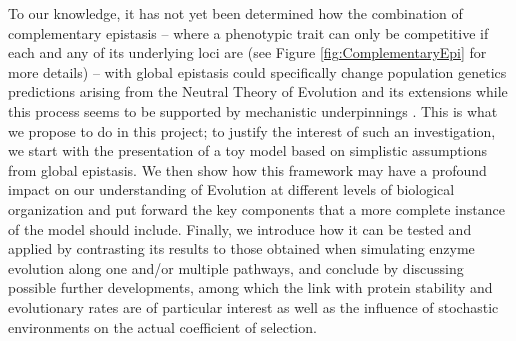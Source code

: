\documentclass[11pt,onecolumn]{article}
\begin{document}
To our knowledge, it has not yet been determined how the combination of complementary epistasis -- where a phenotypic trait can only be competitive if each and any of its underlying loci are (see Figure \ref{fig:ComplementaryEpi} for more details) -- with global epistasis could specifically change population genetics predictions arising from the Neutral Theory of Evolution and its extensions \citep{Kimura68,Ohta73,Ohta92} while this process seems to be supported by mechanistic underpinnings \citep{Kacser73,Hartl85,Yi19,Taverna02,Bloom05,Labourel20}. This is what we propose to do in this project; to justify the interest of such an investigation, we start with the presentation of a toy model based on simplistic assumptions from global epistasis. We then show how this framework may have a profound impact on our understanding of Evolution at different levels of biological organization and put forward the key components that a more complete instance of the model should include. Finally, we introduce how it can be tested and applied by contrasting its results to those obtained when simulating enzyme evolution along one and/or multiple pathways, and conclude by discussing possible further developments, among which the link with protein stability and evolutionary rates are of particular interest as well as the influence of stochastic environments on the actual coefficient of selection.
\end{document}
